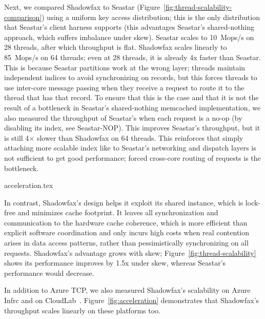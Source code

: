 Next, we compared Shadowfax to Seastar
(Figure~\ref{fig:thread-scalability-comparison}) using a uniform key access
distribution; this is the only distribution that Seastar's client harness
supports (this advantages Seastar's shared-nothing approach, which suffers
imbalance under skew).
%
Seastar scales to 10~Mops/s on 28 threads, after which throughput is flat.
%
Shadowfax scales linearly to 85~Mops/s on 64 threads; even at 28 threads, it is
already 4x faster than Seastar.
%
This is because Seastar partitions work at the wrong layer; threads maintain
independent indices to avoid synchronizing on records, but this forces threads
to use inter-core message passing when they receive a request to route it to
the thread that has that record.
%
To ensure that this is the case and that it is not the result of a bottleneck in
Seastar's shared-nothing memcached implementation, we also measured the
throughput of Seastar's when each request is a no-op (by disabling its index,
see Seastar-NOP).
%
This improves Seastar's throughput, but it is still 4$\times{}$ slower
than Shadowfax on 64 threads.
%
This reinforces that simply attaching more scalable index like
\faster to Seastar's networking and dispatch layers is not sufficient to get
good performance; forced cross-core routing of requests is the bottleneck.

 {acceleration.tex}

In contrast, Shadowfax's design helps it exploit its shared \faster instance,
which is lock-free and minimizes cache footprint.
%
It leaves all synchronization and communication to the hardware
cache coherence, which is more efficient than explicit software
coordination and only incurs high costs when real contention arises in data
access patterns, rather than pessimistically synchronizing on all requests.
%
Shadowfax's advantage grows with skew;
Figure~\ref{fig:thread-scalability} shows its performance improves by 1.5x
under skew, whereas Seastar's performance would decrease.
%
%

In addition to Azure TCP, we also measured Shadowfax's scalability on
Azure Infrc and on CloudLab~\cite{cloudlab}.
%
Figure~\ref{fig:acceleration} demonstrates that Shadowfax's throughput
scales linearly on these platforms too.

